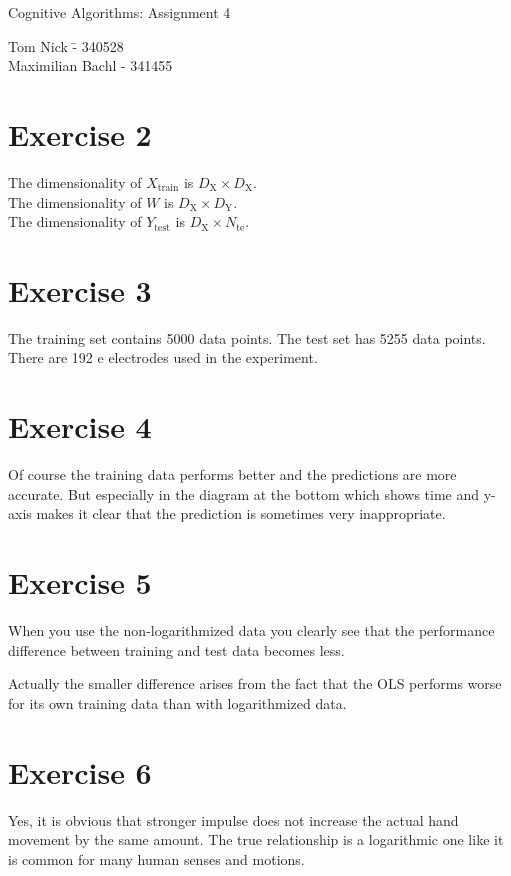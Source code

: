 \documentclass[a4paper,10pt]{article}
\begin{document}
\begin{center}
\Large{Cognitive Algorithms: Assignment 4} \\
\end{center}
\begin{tabbing}
Tom Nick \hspace{2cm}\= - 340528\\
Maximilian Bachl \> - 341455 \\
\end{tabbing}

\section*{Exercise 2}

The dimensionality of $X_\textrm{train}$ is $D_\textrm{X} \times D_\textrm{X}$.\\
The dimensionality of $W$ is $D_\textrm{X} \times D_\textrm{Y}$.\\
The dimensionality of $Y_\textrm{test}$ is $D_\textrm{X} \times N_\textrm{te}$.

\section*{Exercise 3}

The training set contains 5000 data points. The test set has 5255 data points. There are 192 e
electrodes used in the experiment.

\section*{Exercise 4}

Of course the training data performs better and the predictions are more accurate. But especially in the diagram at the bottom which shows time and y-axis makes it clear that the prediction is sometimes very inappropriate.

\section*{Exercise 5}

When you use the non-logarithmized data you clearly see that the performance difference between training and test data becomes less.

Actually the smaller difference arises from the fact that the OLS performs worse for its own training data than with logarithmized data.

\section*{Exercise 6}

Yes, it is obvious that stronger impulse does not increase the actual hand movement by the same amount. The true relationship is a logarithmic one like it is common for many human senses and motions.
\end{document}
